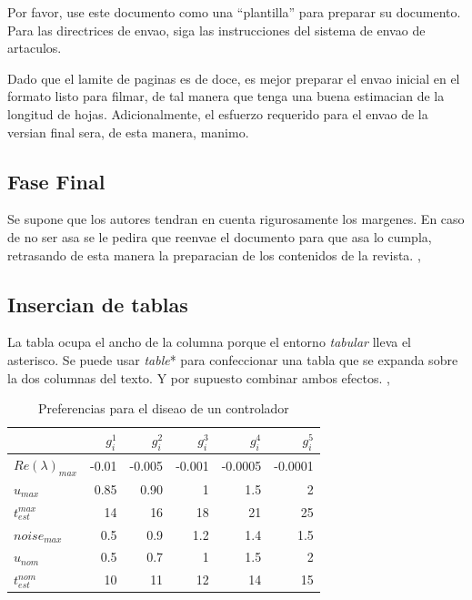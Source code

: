 \documentclass[5p,times,authoryear]{elsarticle}
\begin{document}
Por favor, use este documento como una ``plantilla'' para preparar su documento. Para las directrices de envao, siga las instrucciones del sistema de envao de artaculos.

Dado que el lamite de paginas es de doce, es mejor preparar el envao inicial en el formato listo para filmar, de tal manera que tenga una buena estimacian de la longitud de hojas. Adicionalmente, el esfuerzo requerido para el envao de la versian final sera, de esta manera, manimo.

\subsection{Fase Final}

Se supone que los autores tendran en cuenta rigurosamente los margenes. En caso de no ser asa se le pedira que reenvae el documento para que asa lo cumpla, retrasando de esta manera la preparacian de los contenidos de la revista. \citep{Bak:63a}, \citep{Bak:63b}

\subsection{Insercian de tablas}

La tabla ocupa el ancho de la columna porque el entorno \emph{tabular} lleva el asterisco. Se puede usar \emph{table}* para confeccionar una tabla que se expanda sobre la dos columnas del texto. Y por supuesto combinar ambos efectos. \citep{Heritage:92}, \citep{ChaRou:66}


\begin{table}[htbp]
  \caption{Preferencias para el diseao de un controlador}
   \label{extremos45}
  \begin{tabular*}{\hsize}{lrrrrr}
\hline
    & $g_i^1$ & $g_i^2$ & $g_i^3$ & $g_i^4$ & $g_i^5$ \\
    \hline
$Re(\lambda)_{max}$ & -0.01  & -0.005 & -0.001 & -0.0005 & -0.0001 \\
$u_{max}$& 0.85 & 0.90 & 1 & 1.5 & 2  \\
$t_{est}^{max}$& 14 & 16 & 18 & 21 & 25 \\
$noise_{max}$& 0.5 & 0.9 & 1.2 & 1.4 & 1.5  \\
$u_{nom}$& 0.5 & 0.7 & 1  & 1.5 & 2  \\
$t_{est}^{nom}$& 10 & 11 & 12 & 14 & 15 \\
\hline
  \end{tabular*}
\end{table}
\end{document}

